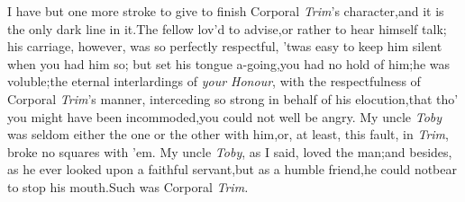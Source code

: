 \documentclass{article}
\begin{document}
\newpage
I have but one more stroke to give to finish Corporal
\textit{Trim}’s character,\tsh and it is the only dark
line in it.\tsk The fellow lov’d to advise,\tsk or rather to
hear himself talk; his carriage, however, was so perfectly
respectful, ’twas easy to keep him silent when you had him
so; but set his tongue a-going,\tsk you had no hold of
him;\tsk he was voluble;\tsk the eternal interlardings of
\textit{your Honour}, with the respectfulness of Corporal
\textit{Trim}’s manner, interceding so strong in behalf of his
elocution,\tsk that tho’ you might have been
incommoded,\tsk you could not well be angry. My uncle
\textit{Toby} was seldom either the one or the other with
him,\tsk\break or, at least, this fault, in \textit{Trim}, broke no
squares with ’em. My uncle \textit{Toby}, as I said, loved the
man;\tsh and besides, as he ever looked upon a faithful
servant,\tsk\break but as a humble friend,\tsk he could not\pb bear to
stop his mouth.\tsh Such was Corporal \textit{Trim.}
\end{document}
